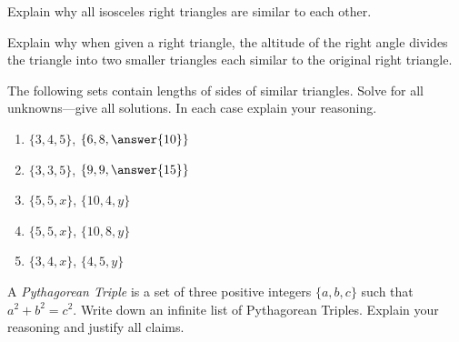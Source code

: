 \documentclass[nooutcomes]{ximera}
\begin{document}
\begin{question}Explain why all isosceles right triangles are similar to each other. 
\begin{freeResponse}
\begin{hint}
\end{hint}
\end{freeResponse}
\end{question}

\begin{question}
Explain why when given a right triangle, the altitude of the
  right angle divides the triangle into two smaller triangles each
  similar to the original right triangle.
\begin{freeResponse}
\begin{hint}
\end{hint}
\end{freeResponse}
\end{question}

\begin{question}
The following sets contain lengths of sides of similar
  triangles. Solve for all unknowns---give all solutions. In each case
  explain your reasoning.
\begin{enumerate}
\item $\{3,4,5\}$, $\{6,8,\answer{10}\}$
\item $\{3,3,5\}$, $\{9,9,\answer{15}\}$
\item $\{5,5,x\}$, $\{10,4,y\}$
\item $\{5,5,x\}$, $\{10,8,y\}$
\item $\{3,4,x\}$, $\{4,5,y\}$ 
\end{enumerate}
\begin{freeResponse}
\begin{hint}
\end{hint}
\end{freeResponse}
\end{question}

\begin{question}
A \textit{Pythagorean Triple} is a set
  of three positive integers $\{a,b,c\}$ such that $a^2 + b^2 =
  c^2$. Write down an infinite list of Pythagorean Triples. Explain
  your reasoning and justify all claims.
\begin{freeResponse}
\begin{hint}
\end{hint}
\end{freeResponse}
\end{question}
\end{document}
